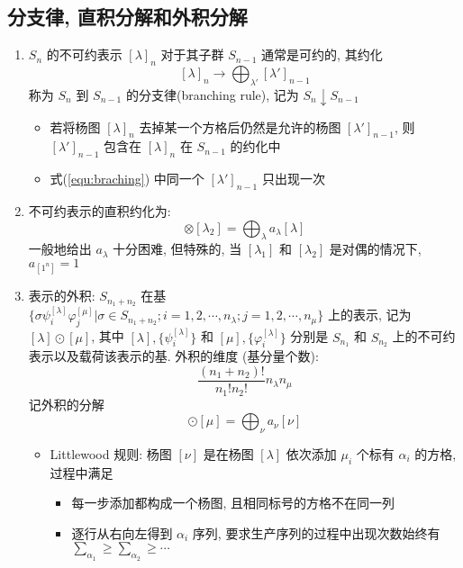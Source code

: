\documentclass[12pt,a4paper]{article}%
\numberwithin{equation}{section}%
\begin{document}
\subsection{分支律, 直积分解和外积分解} %
\label{sub:branch_reduce}
\begin{enumerate}
	\item $S_n$ 的不可约表示 $[\lambda]_n$ 对于其子群 $S_{n-1}$ 通常是可约的, 其约化
	\begin{equation}\label{equ:braching}
		[\lambda]_n \rightarrow \bigoplus_{\lambda'}[\lambda']_{n-1}
	\end{equation}
	称为 $S_n$ 到 $S_{n-1}$ 的分支律(branching rule), 记为 $S_n\downarrow S_{n-1}$
	\begin{itemize}
		\item 若将杨图 $[\lambda]_n$ 去掉某一个方格后仍然是允许的杨图 $[\lambda']_{n-1}$, 则 $[\lambda']_{n-1}$ 包含在 $[\lambda]_n$ 在 $S_{n-1}$ 的约化中
		\item 式(\ref{equ:braching}) 中同一个 $[\lambda']_{n-1}$ 只出现一次
	\end{itemize}
	\item 不可约表示的直积约化为:
	\begin{equation}
		[\lambda_1]\otimes[\lambda_2] = \bigoplus_\lambda a_\lambda[\lambda]
	\end{equation}
	一般地给出 $a_\lambda$ 十分困难, 但特殊的, 当 $[\lambda_1]$ 和 $[\lambda_2]$ 是对偶的情况下, $a_{[1^n]} = 1$
	\item 表示的外积: $S_{n_1+n_2}$ 在基 $\{\sigma\psi^{[\lambda]}_i\varphi^{[\mu]}_j|\sigma\in S_{n_1+n_2}; i =1,2,\cdots,n_\lambda;j = 1,2,\cdots,n_\mu\}$ 上的表示, 记为 $[\lambda]\odot[\mu]$, 其中 $[\lambda],\{\psi^{[\lambda]}_i\}$ 和 $[\mu],\{\varphi^{[\lambda]}_i\}$ 分别是 $S_{n_1}$ 和 $S_{n_2}$ 上的不可约表示以及载荷该表示的基. 外积的维度 (基分量个数):
	\begin{equation}
		\frac{(n_1+n_2)!}{n_1!n_2!}n_\lambda n_\mu
	\end{equation}
	记外积的分解
	\begin{equation}
		[\lambda]\odot [\mu] = \bigoplus_\nu a_\nu[\nu]
	\end{equation}
	\begin{itemize}
		\item Littlewood 规则: 杨图 $[\nu]$ 是在杨图 $[\lambda]$ 依次添加 $\mu_i$ 个标有 $\alpha_i$ 的方格, 过程中满足
		\begin{itemize}
			\item 每一步添加都构成一个杨图, 且相同标号的方格不在同一列
			\item 逐行从右向左得到 $\alpha_i$ 序列, 要求生产序列的过程中出现次数始终有 $\sum_{\alpha_1}\ge\sum_{\alpha_2}\ge\cdots$

\end{itemize}
\end{itemize}
\end{enumerate}
\end{document}
